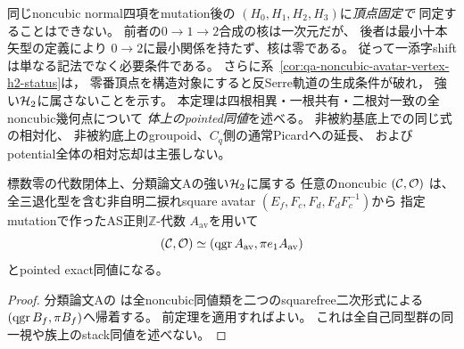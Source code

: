 \begin{remark}[位相の取り違えと相対境界]
\label{rem:qa-pointed-phase-obstruction}
同じnoncubic normal四項をmutation後の
$(H_0,H_1,H_2,H_3)$に\emph{頂点固定で}
同定することはできない。
前者の$0\to1\to2$合成の核は一次元だが、
後者は最小十本矢型の定義により
$0\to2$に最小関係を持たず、核は零である。
従って一添字shiftは単なる記法でなく必要条件である。
さらに系~\ref{cor:qa-noncubic-avatar-vertex-h2-status}は，
零番頂点を構造対象にすると反Serre軌道の生成条件が破れ，
強い$\mathcal H_2$に属さないことを示す。
本定理は四根相異・一根共有・二根対一致の全noncubic幾何点について
\emph{体上のpointed同値}を述べる。
非被約基底上での同じ式の相対化、
非被約底上のgroupoid、$C_q$側の通常Picardへの延長、
およびpotential全体の相対忘却は主張しない。
\end{remark}

\begin{corollary}
\label{cor:qa-point-all-noncubic-h2}
標数零の代数閉体上、分類論文Aの強い$\mathcal H_2$に属する
任意のnoncubic $(\mathcal C,\mathcal O)$ は、
全三退化型を含む非自明二捩れsquare avatar
$(E_f,F_c,F_d,F_dF_c^{-1})$から
指定mutationで作ったAS正則$\mathbb Z$-代数
$A_{\mathrm{av}}$を用いて
\[
 (\mathcal C,\mathcal O)\simeq
 (\operatorname{qgr} A_{\mathrm{av}},\pi e_1A_{\mathrm{av}})
\]
とpointed exact同値になる。
\end{corollary}
\begin{proof}
分類論文Aの
\cite[\texttt{thm:noncubic-classification}]{QuadricIntrinsic2026}
は全noncubic同値類を二つのsquarefree二次形式による
$(\operatorname{qgr} B_f,\pi B_f)$へ帰着する。
前定理を適用すればよい。
これは全自己同型群の同一視や族上のstack同値を述べない。
\end{proof}


